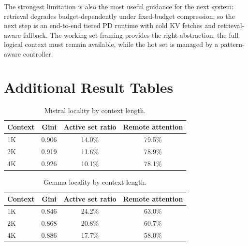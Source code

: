 \documentclass[11pt]{article}
\newcommand{\pct}{\%}
\theoremstyle{definition}
\theoremstyle{plain}
\begin{document}
The strongest limitation is also the most useful guidance for the next system: retrieval degrades budget-dependently under fixed-budget compression, so the next step is an end-to-end tiered PD runtime with cold KV fetches and retrieval-aware fallback.  The working-set framing provides the right abstraction: the full logical context must remain available, while the hot set is managed by a pattern-aware controller.

\appendix

\section{Additional Result Tables}
\label{app:tables}

\begin{table}[h]
\centering
\caption{Mistral locality by context length.}
\small
\begin{tabular}{lccc}
\toprule
Context & Gini & Active set ratio & Remote attention \\
\midrule
1K & 0.906 & 14.0\pct{} & 79.5\pct{} \\
2K & 0.919 & 11.6\pct{} & 78.9\pct{} \\
4K & 0.926 & 10.1\pct{} & 78.1\pct{} \\
\bottomrule
\end{tabular}
\end{table}

\begin{table}[h]
\centering
\caption{Gemma locality by context length.}
\small
\begin{tabular}{lccc}
\toprule
Context & Gini & Active set ratio & Remote attention \\
\midrule
1K & 0.846 & 24.2\pct{} & 63.0\pct{} \\
2K & 0.868 & 20.8\pct{} & 60.7\pct{} \\
4K & 0.886 & 17.7\pct{} & 58.0\pct{} \\
\bottomrule
\end{tabular}
\end{table}



\end{document}

